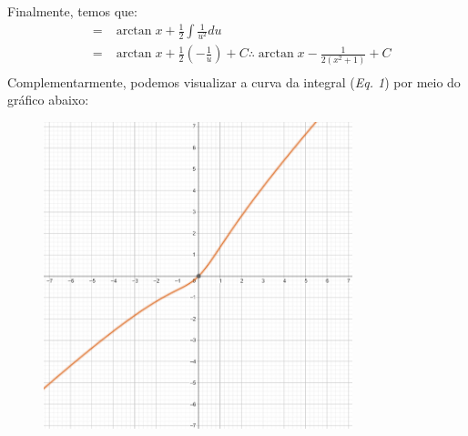 \documentclass[12pt]{article}
\begin{document}
Finalmente, temos que:
\begin{eqnarray}
    & = & \arctan x + \frac{1}{2}\int \frac{1}{u^2}du \\ \nonumber
    & = & \arctan x + \frac{1}{2} \left(-\frac{1}{u}\right)+C \therefore \arctan x - \frac{1}{2(x^2+1)}+C \\ \nonumber
\end{eqnarray}
Complementarmente, podemos visualizar a curva da integral (\emph{Eq. 1}) por meio do gráfico abaixo:
\begin{figure}[h]
    \centering
    \includegraphics[width=0.8\textwidth]{fig/fig3.PNG}
\end{figure}
\end{document}
